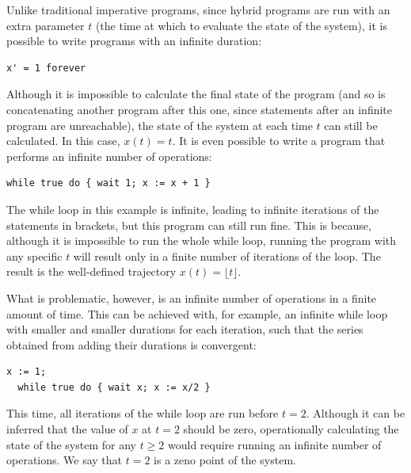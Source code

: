 Unlike traditional imperative programs, since hybrid programs are run with an extra parameter $t$ (the time at which to evaluate the state of the system), it is possible to write programs with an infinite duration:

\begin{lstlisting}[caption=Hybrid program with infinite duration,label=lst:inf_program]
  x' = 1 forever
\end{lstlisting}

Although it is impossible to calculate the final state of the program (and so is concatenating another program after this one, since statements after an infinite program are unreachable), the state of the system at each time $t$ can still be calculated. In this case, $x(t) = t$. It is even possible to write a program that performs an infinite number of operations:

\begin{lstlisting}[caption=Hybrid program with infinite operations,label=lst:inf_operations_inf_duration]
  while true do { wait 1; x := x + 1 }
\end{lstlisting}

The while loop in this example is infinite, leading to infinite iterations of the statements in brackets, but this program can still run fine. This is because, although it is impossible to run the whole while loop, running the program with any specific $t$ will result only in a finite number of iterations of the loop. The result is the well-defined trajectory $x(t) = \lfloor t \rfloor$.

What is problematic, however, is an infinite number of operations in a finite amount of time. This can be achieved with, for example, an infinite while loop with smaller and smaller durations for each iteration, such that the series obtained from adding their durations is convergent:

\begin{lstlisting}[caption=Hybrid program with infinite operations in a finite amount of time,label=lst:inf_operations_finite_duration]
  x := 1;
  while true do { wait x; x := x/2 }
\end{lstlisting}

This time, all iterations of the while loop are run before $t=2$. Although it can be inferred that the value of $x$ at $t=2$ should be zero, operationally calculating the state of the system for any $t \geq 2$ would require running an infinite number of operations. We say that $t=2$ is a zeno point of the system.

